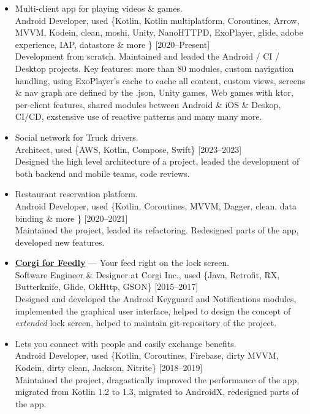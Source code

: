 \documentclass[a4paper]{article}
\begin{document}
	\begin{itemize}
		\item \faAndroid \faLinux \enskip Multi-client app for playing videos \& games. \\[0.2em]
		{\footnotesize Android Developer, used \{Kotlin, Kotlin multiplatform, Coroutines, Arrow, MVVM, Kodein, clean, moshi, Unity, NanoHTTPD, ExoPlayer, glide, adobe experience, IAP, datastore \& more \} \hfill [2020--Present]} \\[0.2em]
		Development from scratch. Maintained and leaded the Android / CI / Desktop projects. Key features: more than 80 modules, custom navigation handling, using ExoPlayer's cache to cache all content, custom views, screens \& nav graph are defined by the .json, Unity games, Web games with ktor, per-client features, shared modules between Android \& iOS \& Deskop, CI/CD, exstensive use of reactive patterns and many many more. 
  
		\item \faAndroid \enskip Social network for Truck drivers. \\[0.2em]
		{\footnotesize Architect, used \{AWS, Kotlin, Compose, Swift\} \hfill [2023--2023]} \\[0.2em]
		Designed the high level architecture of a project, leaded the development of both backend and mobile teams, code reviews.
		
		\item \faAndroid \enskip Restaurant reservation platform. \\[0.2em]
		{\footnotesize Android Developer, used \{Kotlin, Coroutines, MVVM, Dagger, clean, data binding \& more \} \hfill [2020--2021]} \\[0.2em]
		Maintained the project, leaded its refactoring. Redesigned parts of the app, developed new features.
		
		\item \faAndroid \enskip \href{http://getcorgi.com/}{\textbf{Corgi for Feedly}} --- Your feed right on the lock screen. \\[0.2em]
		{\footnotesize Software Engineer \& Designer at Corgi Inc., used \{Java, Retrofit, RX, Butterknife, Glide, OkHttp, GSON\} \hfill [2015--2017]} \\[0.2em]
		Designed and developed the Android Keyguard and Notifications modules, implemented the graphical user interface, helped to design the concept of \textit{extended} lock screen, helped to maintain git-repository of the project.
		
		\item \faAndroid \enskip Lets you connect with people and easily exchange benefits. \\[0.2em]
		{\footnotesize Android Developer, used \{Kotlin, Coroutines, Firebase, dirty MVVM, Kodein, dirty clean, Jackson, Nitrite\} \hfill [2018--2019]} \\[0.2em]
		Maintained the project, dragastically improved the performance of the app, migrated from Kotlin 1.2 to 1.3, migrated to AndroidX, redesigned parts of the app.
		

\end{itemize}
\end{document}
